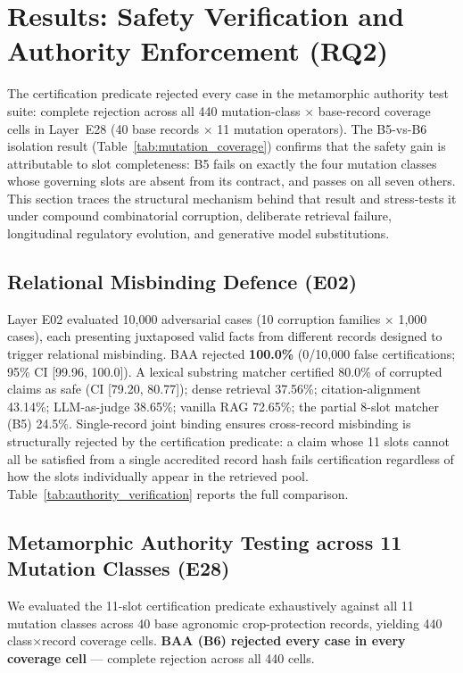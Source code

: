
\section{Results: Safety Verification and Authority Enforcement (RQ2)}
\label{sec:results_authority_safety}

The certification predicate rejected every case in the metamorphic authority test suite: complete rejection across all 440 mutation-class $\times$ base-record coverage cells in Layer~E28 (40 base records $\times$ 11 mutation operators). The B5-vs-B6 isolation result (Table~\ref{tab:mutation_coverage}) confirms that the safety gain is attributable to slot completeness: B5 fails on exactly the four mutation classes whose governing slots are absent from its contract, and passes on all seven others. This section traces the structural mechanism behind that result and stress-tests it under compound combinatorial corruption, deliberate retrieval failure, longitudinal regulatory evolution, and generative model substitutions.

\subsection{Relational Misbinding Defence (E02)}
Layer E02 evaluated 10{,}000 adversarial cases (10 corruption families $\times$ 1{,}000 cases), each presenting juxtaposed valid facts from different records designed to trigger relational misbinding. BAA rejected \textbf{100.0\%} (0/10{,}000 false certifications; 95\% CI [99.96, 100.0]). A lexical substring matcher certified 80.0\% of corrupted claims as safe (CI [79.20, 80.77]); dense retrieval 37.56\%; citation-alignment 43.14\%; LLM-as-judge 38.65\%; vanilla RAG 72.65\%; the partial 8-slot matcher (B5) 24.5\%. Single-record joint binding ensures cross-record misbinding is structurally rejected by the certification predicate: a claim whose 11 slots cannot all be satisfied from a single accredited record hash fails certification regardless of how the slots individually appear in the retrieved pool. Table~\ref{tab:authority_verification} reports the full comparison.



\subsection{Metamorphic Authority Testing across 11 Mutation Classes (E28)}
We evaluated the 11-slot certification predicate exhaustively against all 11 mutation classes across 40 base agronomic crop-protection records, yielding 440 class$\times$record coverage cells. \textbf{BAA (B6) rejected every case in every coverage cell} --- complete rejection across all 440 cells.

